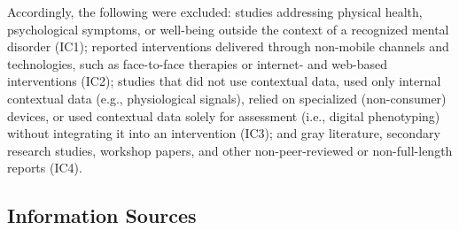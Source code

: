 Accordingly, the following were excluded: studies addressing physical health, psychological symptoms, or well-being outside the context of a recognized mental disorder (IC1); reported interventions delivered through non-mobile channels and technologies, such as face-to-face therapies or internet- and web-based interventions (IC2); studies that did not use contextual data, used only internal contextual data (e.g., physiological signals), relied on specialized (non-consumer) devices, or used contextual data solely for assessment (i.e., digital phenotyping) without integrating it into an intervention (IC3); and gray literature, secondary research studies, workshop papers, and other non-peer-reviewed or non-full-length reports (IC4).



    
    
    


\subsection{Information Sources}   


